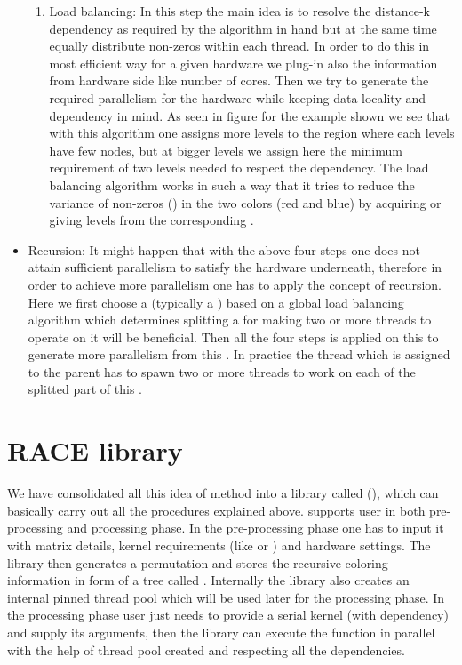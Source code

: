 \begin{itemize}
\begin{enumerate}
		\item Load balancing: In this step the main idea is to resolve the distance-k dependency as required by the algorithm in hand but at the same time equally distribute non-zeros within each thread. In order to do this in most efficient way for a given hardware we plug-in also the information from hardware side like number of cores. Then we try to generate the required parallelism for the hardware while keeping data locality and dependency in mind. As seen in figure for the example shown we see that with this algorithm one assigns more levels to the region where each levels have few nodes, but at bigger levels we assign here the minimum requirement of two levels needed to respect the dependency. The load balancing algorithm works in such a way that it tries to reduce the variance of non-zeros (\nnz) in the two colors (red and blue) by acquiring or giving levels from the corresponding \levelGroup. 
		
		\end{enumerate}
		\item Recursion: It might happen that with the above four steps one does not attain sufficient parallelism to satisfy the hardware underneath, therefore in order to achieve more parallelism one has to apply the concept of recursion. Here we first choose a \subgraph (typically a \levelGroup) based on a global load balancing algorithm which determines splitting a \levelGroup for making two or more threads to operate on it will be beneficial. Then all the four steps is applied on this \subgraph to generate more parallelism from this \subgraph. In practice the thread which is assigned to the parent \subgraph has to spawn two or more threads to work on each of the splitted part of this \subgraph. 
\end{itemize}

\section{RACE library}
We have consolidated all this idea of \RAC method into a library called \RACEfull (\RACE), which can basically carry out all the procedures explained above. \RACE supports user in both pre-processing and processing phase. In the pre-processing phase one has to input it with matrix details, kernel requirements (like \DONE or \DTWO) and hardware settings. The library then generates a permutation and stores the recursive coloring information in form of a tree called \levelTree. Internally the library also creates an internal pinned thread pool which will be used later for the processing phase. In the processing phase user just needs to provide a serial kernel (with dependency) and supply its arguments, then the library can execute the function in parallel with the help of thread pool created and respecting all the dependencies.

